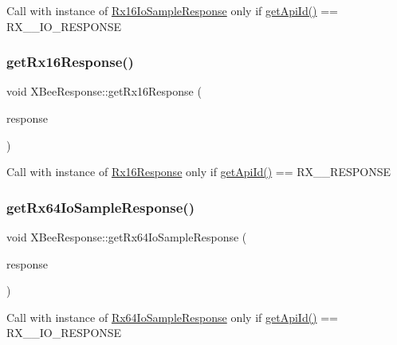 Call with instance of \hyperlink{class_rx16_io_sample_response}{Rx16\+Io\+Sample\+Response} only if \hyperlink{class_x_bee_response_a4a9677e3b39054119fa278d1ad52130a}{get\+Api\+Id()} == R\+X\+\_\+\_\+\+I\+O\+\_\+\+R\+E\+S\+P\+O\+N\+SE \hypertarget{class_x_bee_response_ab85f25eac3e57d665e2189d84cb5d2e3}{}\label{class_x_bee_response_ab85f25eac3e57d665e2189d84cb5d2e3} 
\subsubsection{\texorpdfstring{get\+Rx16\+Response()}{getRx16Response()}}
{\footnotesize\ttfamily void X\+Bee\+Response\+::get\+Rx16\+Response (\begin{DoxyParamCaption}\item[{\hyperlink{class_x_bee_response}{X\+Bee\+Response} \&}]{response }\end{DoxyParamCaption})}

Call with instance of \hyperlink{class_rx16_response}{Rx16\+Response} only if \hyperlink{class_x_bee_response_a4a9677e3b39054119fa278d1ad52130a}{get\+Api\+Id()} == R\+X\+\_\+\_\+\+R\+E\+S\+P\+O\+N\+SE \hypertarget{class_x_bee_response_ae298de16ed0dce349154ae87f8b93d77}{}\label{class_x_bee_response_ae298de16ed0dce349154ae87f8b93d77} 
\subsubsection{\texorpdfstring{get\+Rx64\+Io\+Sample\+Response()}{getRx64IoSampleResponse()}}
{\footnotesize\ttfamily void X\+Bee\+Response\+::get\+Rx64\+Io\+Sample\+Response (\begin{DoxyParamCaption}\item[{\hyperlink{class_x_bee_response}{X\+Bee\+Response} \&}]{response }\end{DoxyParamCaption})}

Call with instance of \hyperlink{class_rx64_io_sample_response}{Rx64\+Io\+Sample\+Response} only if \hyperlink{class_x_bee_response_a4a9677e3b39054119fa278d1ad52130a}{get\+Api\+Id()} == R\+X\+\_\+\_\+\+I\+O\+\_\+\+R\+E\+S\+P\+O\+N\+SE \hypertarget{class_x_bee_response_a72e5b863c14a9ec0a4f1cdeba5f24e58}{}\label{class_x_bee_response_a72e5b863c14a9ec0a4f1cdeba5f24e58} 
